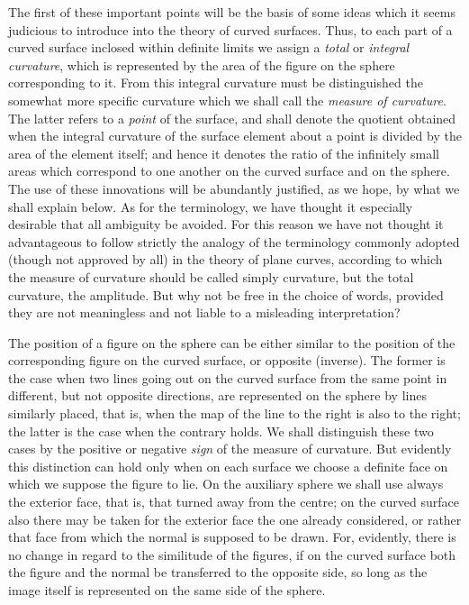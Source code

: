 The first of these important points will be the basis of some ideas which it seems
judicious to introduce into the theory of curved surfaces. Thus, to each part of a curved
surface inclosed within definite limits we assign a \emph{total} or \emph{integral curvature}, which is
represented by the area of the figure on the sphere corresponding to it. From this
integral curvature must be distinguished the somewhat more specific curvature which we
shall call the \emph{measure of curvature}. The latter refers to a \emph{point} of the surface, and shall
denote the quotient obtained when the integral curvature of the surface element about
a point is divided by the area of the element itself; and hence it denotes the ratio of the
infinitely small areas which correspond to one another on the curved surface and on the
sphere. The use of these innovations will be abundantly justified, as we hope, by what
we shall explain below. As for the terminology, we have thought it especially desirable
that all ambiguity be avoided. For this reason we have not thought it advantageous to
follow strictly the analogy of the terminology commonly adopted (though not approved by
all) in the theory of plane curves, according to which the measure of curvature should be
called simply curvature, but the total curvature, the amplitude. But why not be free in
the choice of words, provided they are not meaningless and not liable to a misleading
interpretation?

The position of a figure on the sphere can be either similar to the position of the
corresponding figure on the curved surface, or opposite (inverse). The former is the case
when two lines going out on the curved surface from the same point in different, but not
opposite directions, are represented on the sphere by lines similarly placed, that is, when
the map of the line to the right is also to the right; the latter is the case when the contrary
holds. We shall distinguish these two cases by the positive or negative \emph{sign} of the
measure of curvature. But evidently this distinction can hold only when on each surface
we choose a definite face on which we suppose the figure to lie. On the auxiliary sphere
we shall use always the exterior face, that is, that turned away from the centre; on the
curved surface also there may be taken for the exterior face the one already considered,
or rather that face from which the normal is supposed to be drawn. For, evidently, there
is no change in regard to the similitude of the figures, if on the curved surface both the
figure and the normal be transferred to the opposite side, so long as the image itself
is represented on the same side of the sphere.

